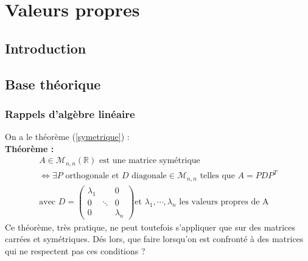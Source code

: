 \documentclass[a4paper,10pt]{report}
\begin{document}
\chapter{Valeurs propres}
\section{Introduction}

\newpage
\section{Base théorique}
\subsection{Rappels d'algèbre linéaire}
\noindent On a le théorème (\ref{symetrique}) :\\
\textbf{Théorème :}
\begin{equation}
\label{symetrique}
\begin{array}{l}
A \in \mathcal{M}_{n,n}(\mathbb{R}) \text{ est une matrice symétrique} \\
\Leftrightarrow \exists P \text{ orthogonale et } D \text{ diagonale} \in \mathcal{M}_{n,n} \text{ telles que } A=PDP^T \\
\text{avec } D = \left( \begin{array}{ccc} \lambda_1 & & 0 \\ 0 & \ddots & 0 \\ 0 & & \lambda_n \end{array} \right) \text{et } \lambda_1, \cdots, \lambda_n \text{ les valeurs propres de A}
\end{array}
\end{equation}
Ce théorème, très pratique, ne peut toutefois s'appliquer que sur des matrices carrées et symétriques. Dés lors, que faire lorsqu'on est confronté à des matrices qui ne respectent pas ces conditions ?
\end{document}
